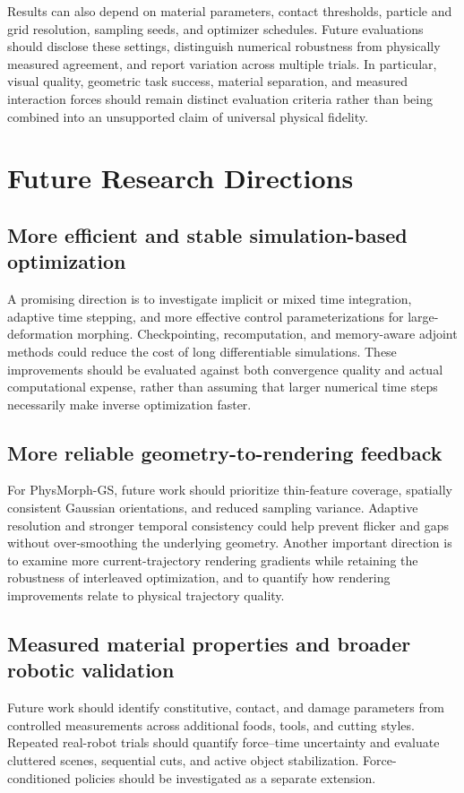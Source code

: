 Results can also depend on material parameters, contact thresholds, particle and grid resolution, sampling seeds, and optimizer schedules. Future evaluations should disclose these settings, distinguish numerical robustness from physically measured agreement, and report variation across multiple trials. In particular, visual quality, geometric task success, material separation, and measured interaction forces should remain distinct evaluation criteria rather than being combined into an unsupported claim of universal physical fidelity.

\section{Future Research Directions}
\label{subsec:future}

\subsection{More efficient and stable simulation-based optimization}
A promising direction is to investigate implicit or mixed time integration, adaptive time stepping, and more effective control parameterizations for large-deformation morphing. Checkpointing, recomputation, and memory-aware adjoint methods could reduce the cost of long differentiable simulations. These improvements should be evaluated against both convergence quality and actual computational expense, rather than assuming that larger numerical time steps necessarily make inverse optimization faster.

\subsection{More reliable geometry-to-rendering feedback}
For PhysMorph-GS, future work should prioritize thin-feature coverage, spatially consistent Gaussian orientations, and reduced sampling variance. Adaptive resolution and stronger temporal consistency could help prevent flicker and gaps without over-smoothing the underlying geometry. Another important direction is to examine more current-trajectory rendering gradients while retaining the robustness of interleaved optimization, and to quantify how rendering improvements relate to physical trajectory quality.

\subsection{Measured material properties and broader robotic validation}
Future work should identify constitutive, contact, and damage parameters from controlled measurements across additional foods, tools, and cutting styles. Repeated real-robot trials should quantify force--time uncertainty and evaluate cluttered scenes, sequential cuts, and active object stabilization. Force-conditioned policies should be investigated as a separate extension.

